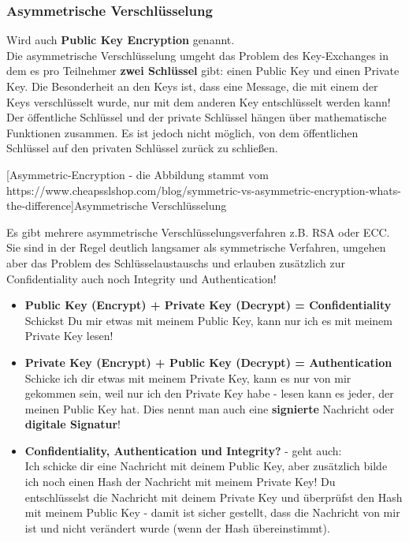 \documentclass[10pt,a4paper,titlepage]{paper}
\begin{document}
\subsubsection{Asymmetrische Verschlüsselung} \label{asym}
Wird auch \textbf{Public Key Encryption} genannt.\\
Die asymmetrische Verschlüsselung umgeht das Problem des Key-Exchanges in dem es pro Teilnehmer \textbf{zwei Schlüssel} gibt: einen Public Key und einen Private Key. Die Besonderheit an den Keys ist, dass eine Message, die mit einem der Keys verschlüsselt wurde, nur mit dem anderen Key entschlüsselt werden kann! Der öffentliche Schlüssel und der private Schlüssel hängen über mathematische Funktionen zusammen. Es ist jedoch nicht möglich, von dem öffentlichen Schlüssel auf den privaten Schlüssel zurück zu schließen.
\begin{center}
[Asymmetric-Encryption - die Abbildung stammt vom https://www.cheapsslshop.com/blog/symmetric-vs-asymmetric-encryption-whats-the-difference]{Asymmetrische Verschlüsselung}
\end{center}
Es gibt mehrere asymmetrische Verschlüsselungsverfahren z.B. RSA oder ECC. Sie sind in der Regel deutlich langsamer als symmetrische Verfahren, umgehen aber das Problem des Schlüsselaustauschs und erlauben zusätzlich zur Confidentiality auch noch Integrity und Authentication!
\begin{itemize}
\item \textbf{Public Key (Encrypt) + Private Key (Decrypt) = Confidentiality}\\Schickst Du mir etwas mit meinem Public Key, kann nur ich es mit meinem Private Key lesen!
\item \textbf{Private Key (Encrypt) + Public Key (Decrypt) = Authentication}\\Schicke ich dir etwas mit meinem Private Key, kann es nur von mir gekommen sein, weil nur ich den Private Key habe - lesen kann es jeder, der meinen Public Key hat. Dies nennt man auch eine \textbf{signierte} Nachricht oder \textbf{digitale Signatur}!
\item \textbf{Confidentiality, Authentication und Integrity?} - geht auch:\\
Ich schicke dir eine Nachricht mit deinem Public Key, aber zusätzlich bilde ich noch einen Hash der Nachricht mit meinem Private Key! Du entschlüsselst die Nachricht mit deinem Private Key und überprüfst den Hash mit meinem Public Key - damit ist sicher gestellt, dass die Nachricht von mir ist und nicht verändert wurde (wenn der Hash übereinstimmt).
\end{itemize}
\end{document}
